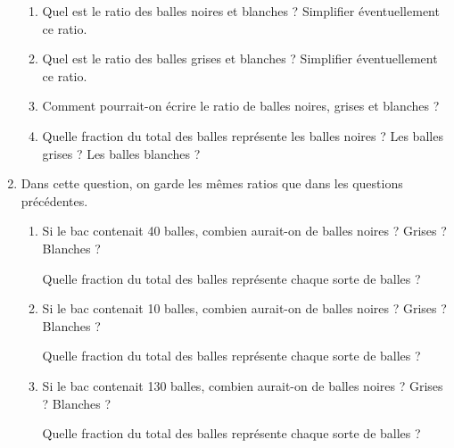 \begin{changemargin}{-10mm}{-10mm}
\begin{activite}
\begin{enumerate}
                \begin{enumerate}
                \item Quel est le ratio des balles noires et blanches ? Simplifier éventuellement ce ratio. \par \medskip
                    \pointilles \medskip
                \item Quel est le ratio des balles grises et blanches ? Simplifier éventuellement ce ratio. \par \medskip
                    \pointilles \medskip
                \item Comment pourrait-on écrire le ratio de balles noires, grises et blanches ? \par \medskip
                    \pointilles \medskip
                \item Quelle fraction du total des balles représente les balles noires ? Les balles grises ? Les balles blanches ? \par \medskip
                    \pointilles \medskip
                \end{enumerate}
            \item Dans cette question, on garde les mêmes ratios que dans les questions précédentes.
                \begin{enumerate}
                \item Si le bac contenait 40 balles, combien aurait-on de balles noires ? Grises ? Blanches ? \par \medskip
                    \pointilles \par \medskip
                    Quelle fraction du total des balles représente chaque sorte de balles ? \par \medskip
                    \pointilles \medskip
                \item Si le bac contenait 10 balles, combien aurait-on de balles noires ? Grises ? Blanches ? \par \medskip
                    \pointilles \par \medskip
                    Quelle fraction du total des balles représente chaque sorte de balles ? \par \medskip
                    \pointilles \medskip
                \item Si le bac contenait 130 balles, combien aurait-on de balles noires ? Grises ? Blanches ? \par \medskip
                    \pointilles \par \medskip
                Quelle fraction du total des balles représente chaque sorte de balles ? \par \medskip

\end{enumerate}
\end{enumerate}
\end{activite}
\end{changemargin}
